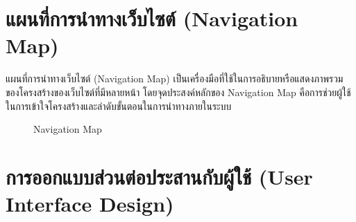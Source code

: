 
\section{แผนที่การนำทางเว็บไซต์ (Navigation Map)}
แผนที่การนำทางเว็บไซต์ (Navigation Map) เป็นเครื่องมือที่ใช้ในการอธิบายหรือแสดงภาพรวมของโครงสร้างของเว็บไซต์ที่มีหลายหน้า โดยจุดประสงค์หลักของ Navigation Map คือการช่วยผู้ใช้ในการเข้าใจโครงสร้างและลำดับขั้นตอนในการนำทางภายในระบบ
\begin{figure}[H]\centering
    \caption{Navigation Map}\label{fig:navMap}
\end{figure}
\newpage

\section{การออกแบบส่วนต่อประสานกับผู้ใช้ (User Interface Design)}

